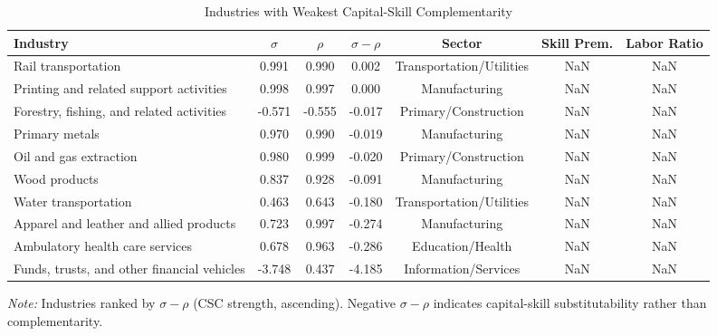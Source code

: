 \begin{table}[H]
\caption{Industries with Weakest Capital-Skill Complementarity}
\label{tab:weakest_csc}
\begin{center}
\small
\begin{tabular}{lcccccc}
\toprule
Industry & $\sigma$ & $\rho$ & $\sigma-\rho$ & Sector & Skill Prem. & Labor Ratio \\
\midrule
Rail transportation & 0.991 & 0.990 & 0.002 & Transportation/Utilities & NaN & NaN \\
Printing and related support activities & 0.998 & 0.997 & 0.000 & Manufacturing & NaN & NaN \\
Forestry, fishing, and related activities & -0.571 & -0.555 & -0.017 & Primary/Construction & NaN & NaN \\
Primary metals & 0.970 & 0.990 & -0.019 & Manufacturing & NaN & NaN \\
Oil and gas extraction & 0.980 & 0.999 & -0.020 & Primary/Construction & NaN & NaN \\
Wood products & 0.837 & 0.928 & -0.091 & Manufacturing & NaN & NaN \\
Water transportation & 0.463 & 0.643 & -0.180 & Transportation/Utilities & NaN & NaN \\
Apparel and leather and allied products & 0.723 & 0.997 & -0.274 & Manufacturing & NaN & NaN \\
Ambulatory health care services & 0.678 & 0.963 & -0.286 & Education/Health & NaN & NaN \\
Funds, trusts, and other financial vehicles & -3.748 & 0.437 & -4.185 & Information/Services & NaN & NaN \\
\bottomrule
\end{tabular}
\end{center}
\begin{minipage}{\textwidth}
\small
\textit{Note:} Industries ranked by $\sigma - \rho$ (CSC strength, ascending). Negative $\sigma - \rho$ indicates capital-skill substitutability rather than complementarity.
\end{minipage}
\end{table}
